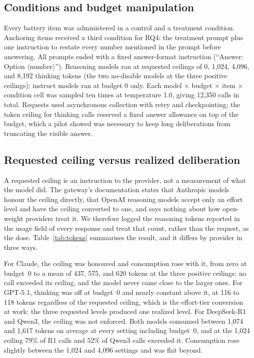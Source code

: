 \documentclass[conference]{IEEEtran}
\begin{document}
\subsection{Conditions and budget manipulation}
Every battery item was administered in a control and a treatment condition. Anchoring items received a third condition for RQ4: the treatment prompt plus one instruction to restate every number mentioned in the prompt before answering. All prompts ended with a fixed answer-format instruction (``Answer: Option $\langle$number$\rangle$''). Reasoning models ran at requested ceilings of 0, 1,024, 4,096, and 8,192 thinking tokens (the two no-disable models at the three positive ceilings); instruct models ran at budget 0 only. Each model $\times$ budget $\times$ item $\times$ condition cell was sampled ten times at temperature 1.0, giving 12,350 calls in total. Requests used asynchronous collection with retry and checkpointing; the token ceiling for thinking calls reserved a fixed answer allowance on top of the budget, which a pilot showed was necessary to keep long deliberations from truncating the visible answer.

\subsection{Requested ceiling versus realized deliberation}
\label{sec:realized}
A requested ceiling is an instruction to the provider, not a measurement of what the model did. The gateway's documentation states that Anthropic models honour the ceiling directly, that OpenAI reasoning models accept only an effort level and have the ceiling converted to one, and says nothing about how open-weight providers treat it. We therefore logged the reasoning tokens reported in the usage field of every response and treat that count, rather than the request, as the dose. Table~\ref{tab:tokens} summarises the result, and it differs by provider in three ways.

For Claude, the ceiling was honoured and consumption rose with it, from zero at budget~0 to a mean of 437, 575, and 620 tokens at the three positive ceilings; no call exceeded its ceiling, and the model never came close to the larger ones. For GPT-5.1, thinking was off at budget~0 and nearly constant above it, at 116 to 118 tokens regardless of the requested ceiling, which is the effort-tier conversion at work: the three requested levels produced one realized level. For DeepSeek-R1 and Qwen3, the ceiling was not enforced. Both models consumed between 1,074 and 1,617 tokens on average at every setting including budget~0, and at the 1,024 ceiling 79\% of R1 calls and 52\% of Qwen3 calls exceeded it. Consumption rose slightly between the 1,024 and 4,096 settings and was flat beyond.
\end{document}
